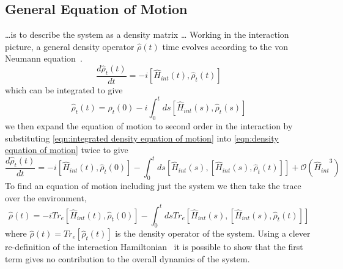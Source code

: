 
\subsection{General Equation of Motion}
\ldots is to describe the system as a density
matrix \ldots
Working in the interaction
picture, a general density operator
\(\hat{\rho}(t)\) time evolves according
to the von Neumann equation~\cite{TP2_Notes}.
\begin{equation}
  \frac{d\hat{\rho}_t(t)}{dt} =
  -i [\hat{H}_{int}(t), \hat{\rho}_t(t)]
  \label{eqn:density equation of motion}
\end{equation}
which can be integrated to give
\begin{equation}
  \hat{\rho}_t(t) =
  \hat{\rho}_t(0)
  - i \int_0^t ds
    [\hat{H}_{int}(s), \hat{\rho}_t(s)]
  \label{eqn:integrated density equation of motion}
\end{equation}
we then expand the equation of motion
to second order in the interaction
by substituting \cref{eqn:integrated density equation of motion}
into \cref{eqn:density equation of motion}
twice to give
\begin{equation}
  \frac{d\hat{\rho}_t(t)}{dt} =
  -i [\hat{H}_{int}(t), \hat{\rho}_t(0)]
  - \int_0^t ds
    [\hat{H}_{int}(s),
      [\hat{H}_{int}(s), \hat{\rho}_t(t)]]
  +\mathcal{O}({\hat{H}_{int}}^3)
\end{equation}
To find an equation of motion
including just the system we then take
the trace over the environment,
\begin{equation}
  \hat{\rho}(t) =
  -i Tr_e[\hat{H}_{int}(t), \hat{\rho}_t(0)]
  - \int_0^t ds
  Tr_e[\hat{H}_{int}(s),
  [\hat{H}_{int}(s), \hat{\rho}_t(t)]]
  \label{eqn:density motion before redfield approximation}
\end{equation}
where \(\hat{\rho}(t) = Tr_e[\hat{\rho}_t(t)]\)
is the density operator of the system.
Using a clever re-definition of the interaction
Hamiltonian~\cite{Manzano_2020} it
is possible to show that the first
term gives no contribution to the
overall dynamics of the system.

